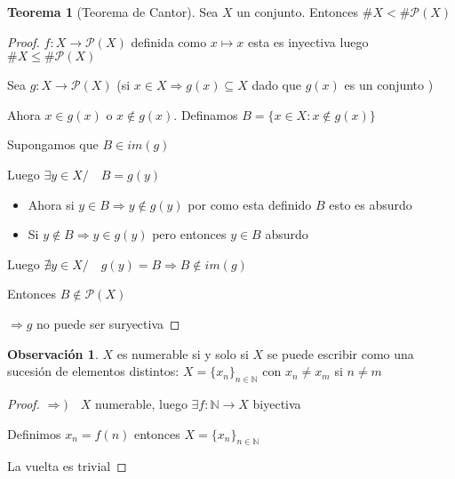 \documentclass[12pt]{article}
\newcommand{\N}{\mathbb{N}}
\newcommand{\Ra}{\Rightarrow}
\newcommand{\ra}{\rightarrow}
\theoremstyle{definition}
\newtheorem*{remark}{Observación}
\newtheorem{theorem}{Teorema}
\begin{document}
\begin{theorem}[Teorema de Cantor]
Sea $X$ un conjunto. Entonces $\# X < \# \mathcal{P}(X)$

\begin{proof}
  $f:X \ra \mathcal{P}(X)$ definida como $x \mapsto {x}$ esta es inyectiva luego $\# X \leq \# \mathcal{P}(X)$

  Sea $g: X \ra \mathcal{P}(X)$ (si $ x \in X  \Ra g(x) \subseteq X$ dado que $g(x) $ es un conjunto )

Ahora $x \in g(x)$ o $x \notin g(x)$. Definamos $B =\{x \in X : x \notin g(x)\}$

Supongamos que $B \in im(g)$ 

Luego $\exists y \in X / \quad B=g(y)$ 
\begin{itemize}
\item Ahora si $y \in B \Ra y \notin g(y)$ por como esta definido $B$ esto es absurdo

\item Si $y \notin B \Ra y \in g(y)$ pero entonces $y \in B$ absurdo
\end{itemize}

Luego $\nexists y \in X / \quad g(y) = B \Ra B \notin im(g)$ 

Entonces $B \notin \mathcal{P}(X)$

$\Ra g$ no puede ser suryectiva


\end{proof}
\end{theorem}

\begin{remark}
  $X$ es numerable si y solo si $X$ se puede escribir como una sucesión de elementos distintos: $X = \{x_{n}\}_{n \in \N}$ con $x_{n} \neq x_{m}$ si $n \neq m$

  \begin{proof}
  $\Ra ) \quad X$ numerable, luego $ \exists f: \N \ra X$ biyectiva

  Definimos $x_{n} = f(n)$ entonces $X= \{x_{n}\}_{n \in \N}$
  
La vuelta es trivial
\end{proof}

\end{remark}
\end{document}
